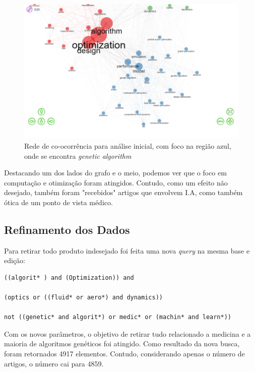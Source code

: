      \begin{figure}
    \centering
    \includegraphics[width=1\textwidth]{experiments/KvotheKS/PesqBibliogr/AlgoritmosSimulacaoOptica-Dinamica/WoS-20220202/OldQueryDataset/CoOccurrence.png}
    \caption{Rede de co-ocorrência para análise inicial, com foco na região azul, onde se encontra \emph{genetic algorithm}}
    \label{fig:KvotheKS:OldQueryCoOccurrence}
\end{figure}
    
    Destacando um dos lados do grafo e o meio, podemos ver que o foco em computação e otimização foram atingidos. Contudo, como um efeito não desejado, também foram "recebidos" artigos que envolvem I.A, como também ótica de um ponto de vista médico.
    
\subsection{Refinamento dos Dados}
    Para retirar todo produto indesejado foi feita uma nova \emph{query} na mesma base e edição:
    
\begin{lstlisting}[basicstyle = \normalsize]
((algorit* ) and (Optimization)) and 

(optics or ((fluid* or aero*) and dynamics))

not ((genetic* and algorit*) or medic* or (machin* and learn*))
\end{lstlisting}

    Com os novos parâmetros, o objetivo de retirar tudo relacionado a medicina e a maioria de algoritmos genéticos foi atingido. Como resultado da nova busca, foram retornados 4917 elementos. Contudo, considerando apenas o número de artigos, o número cai para 4859.
    
